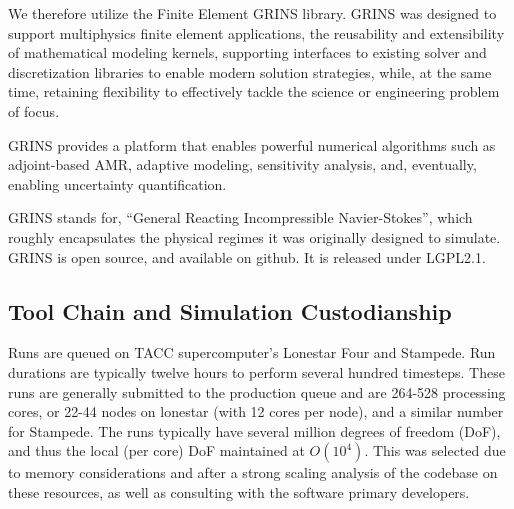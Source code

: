 We therefore utilize the Finite Element GRINS library\cite{GRINSpaper}.
GRINS was designed to support multiphysics finite element
applications, the reusability and extensibility of mathematical
modeling kernels, supporting interfaces to existing solver and
discretization libraries to enable modern solution strategies, while, at
the same time, retaining flexibility to effectively tackle the science
or engineering problem of focus. 

GRINS provides a platform that enables powerful numerical algorithms
such as adjoint-based AMR, adaptive modeling, sensitivity analysis,
and, eventually, enabling uncertainty quantification.

GRINS stands for, ``General Reacting Incompressible Navier-Stokes'',
which roughly encapsulates the physical regimes it was originally
designed to simulate. 
GRINS is open source, and available on github\cite{github}. It is
released under LGPL2.1\cite{lgpl}. 





\subsection{Tool Chain and Simulation Custodianship}

Runs are queued on TACC\cite{tacc} supercomputer's 
Lonestar Four and Stampede. Run durations are typically 
twelve hours to perform several hundred timesteps. 
These runs are generally submitted to the production queue and are  
264-528 processing cores, 
or 22-44 nodes on lonestar (with 12 cores per node), and a similar number
for Stampede. The runs typically have several million degrees of freedom (DoF), 
and thus the local (per core) DoF maintained at $O(10^4)$. This was selected due to 
memory considerations and after a strong scaling analysis of the codebase on these 
resources, as well as consulting with the software primary developers. 

